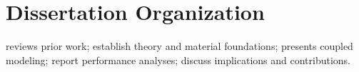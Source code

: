 \section{Dissertation Organization}
 reviews prior work;  establish theory and material foundations;  presents coupled modeling;  report performance analyses;  discuss implications and contributions.
